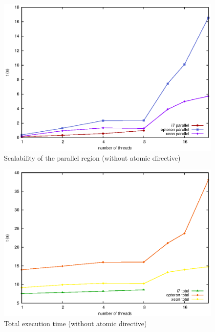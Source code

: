 \documentclass{beamer}
\begin{document}
\begin{frame}[fragile]
	
	\begin{figure}[!htp]
    \centering
    \begin{minipage}[t]{\columnwidth}
        \includegraphics[width=\textwidth]{images/parallel_woat.eps}
        \caption{Scalability of the parallel region (without atomic directive)}
    \end{minipage}
\end{figure}

\end{frame}

\begin{frame}[fragile]
	
	\begin{figure}[!htp]
    \centering
    \begin{minipage}[t]{\columnwidth}
        \includegraphics[width=\textwidth]{images/total_woat.eps}
        \caption{Total execution time (without atomic directive)}
    \end{minipage}
\end{figure}

\end{frame}
\end{document}
